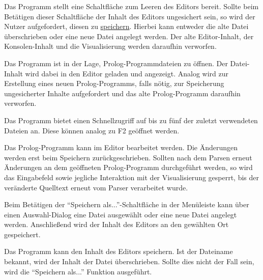 \documentclass[parskip=full,11pt,twoside]{scrartcl}
\begin{document}
Das Programm stellt eine Schaltfläche zum Leeren des Editors bereit. Sollte beim Betätigen dieser Schaltfläche der Inhalt des Editors ungesichert sein, so wird der Nutzer aufgefordert, diesen zu \hyperref[fnc:save]{speichern}. Hierbei kann entweder die alte Datei überschrieben oder eine neue Datei angelegt werden. Der alte Editor-Inhalt, der Konsolen-Inhalt und die Visualisierung werden daraufhin verworfen.


Das Programm ist in der Lage, Prolog-Programmdateien zu öffnen. Der Datei-Inhalt wird dabei in den Editor geladen und angezeigt. Analog wird zur Erstellung eines neuen Prolog-Programms, falls nötig, zur Speicherung ungesicherter Inhalte aufgefordert und das alte Prolog-Programm daraufhin verworfen.


Das Programm bietet einen Schnellzugriff auf bis zu fünf der zuletzt verwendeten Dateien an. Diese können analog zu F2 geöffnet werden.


Das Prolog-Programm kann im Editor bearbeitet werden. Die Änderungen werden erst beim Speichern zurückgeschrieben. Sollten nach dem Parsen erneut Änderungen an dem geöffneten Prolog-Programm durchgeführt werden, so wird das Eingabefeld sowie jegliche Interaktion mit der Visualisierung gesperrt, bis der veränderte Quelltext erneut vom Parser verarbeitet wurde.


Beim Betätigen der \enquote{Speichern als...}-Schaltfläche in der Menüleiste kann über einen Auswahl-Dialog eine Datei ausgewählt oder eine neue Datei angelegt werden. Anschließend wird der Inhalt des Editors an den gewählten Ort gespeichert.

\newpage
{}

Das Programm kann den Inhalt des Editors speichern. Ist der Dateiname bekannt, wird der Inhalt der Datei überschrieben. Sollte dies nicht der Fall sein, wird die \enquote{Speichern als...} Funktion ausgeführt.

\end{document}

